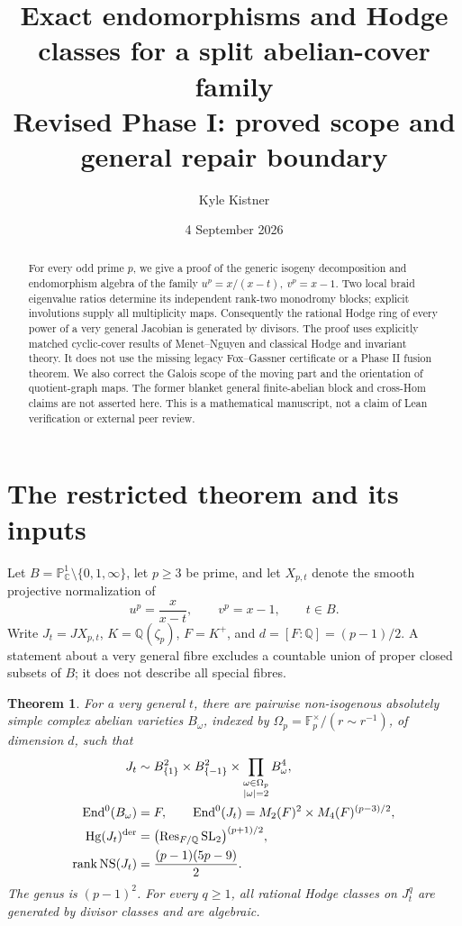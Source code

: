 \documentclass[11pt]{article}
\title{Exact endomorphisms and Hodge classes for a split abelian-cover family\\
\large Revised Phase I: proved scope and general repair boundary}
\author{Kyle Kistner}
\date{4 September 2026}
\newtheorem{theorem}{Theorem}[section]
\theoremstyle{remark}
\newcommand{\Q}{\mathbb Q}
\newcommand{\F}{\mathbb F}
\newcommand{\C}{\mathbb C}
\newcommand{\PP}{\mathbb P}
\newcommand{\End}{\operatorname{End}}
\newcommand{\Hg}{\operatorname{Hg}}
\newcommand{\SL}{\operatorname{SL}}
\newcommand{\Res}{\operatorname{Res}}
\newcommand{\NS}{\operatorname{NS}}
\begin{document}
\maketitle

\begin{abstract}
For every odd prime \(p\), we give a proof of the generic isogeny
decomposition and endomorphism algebra of the family
\(u^p=x/(x-t),\ v^p=x-1\).
Two local braid eigenvalue ratios determine its independent rank-two
monodromy blocks; explicit involutions supply all multiplicity maps.
Consequently the rational Hodge ring of every power of a very general
Jacobian is generated by divisors.  The proof uses explicitly matched
cyclic-cover results of Menet--Nguyen and classical Hodge and invariant
theory.  It does not use the missing legacy Fox--Gassner certificate or a
Phase II fusion theorem.  We also correct the Galois scope of the moving
part and the orientation of quotient-graph maps.  The former blanket
general finite-abelian block and cross-Hom claims are not asserted here.
This is a mathematical manuscript, not a claim of Lean verification or
external peer review.
\end{abstract}

\section{The restricted theorem and its inputs}
Let \(B=\PP^1_\C\setminus\{0,1,\infty\}\), let \(p\geq3\) be prime, and
let \(X_{p,t}\) denote the smooth projective normalization of
\begin{equation}\label{eq:model}
 u^p=\frac{x}{x-t},\qquad v^p=x-1,\qquad t\in B.
\end{equation}
Write \(J_t=JX_{p,t}\), \(K=\Q(\zeta_p)\), \(F=K^+\), and
\(d=[F:\Q]=(p-1)/2\).  A statement about a very general fibre excludes a
countable union of proper closed subsets of \(B\); it does not describe all
special fibres.

\begin{theorem}\label{thm:main}
For a very general \(t\), there are pairwise non-isogenous absolutely
simple complex abelian varieties \(B_\omega\), indexed by
\(\Omega_p=\F_p^\times/(r\sim r^{-1})\), of dimension \(d\), such that
\begin{align}
 J_t&\sim B_{\{1\}}^2\times B_{\{-1\}}^2
       \times\prod_{\substack{\omega\in\Omega_p\\|\omega|=2}}B_\omega^4,
       \label{eq:decomposition}\\
 \End^0(B_\omega)&=F,\qquad
 \End^0(J_t)=M_2(F)^2\times M_4(F)^{(p-3)/2},\label{eq:end}\\
 \Hg(J_t)^{\rm der}&=
       \bigl(\Res_{F/\Q}\SL_2\bigr)^{(p+1)/2},\label{eq:hg}\\
 \operatorname{rank}\NS(J_t)&=\frac{(p-1)(5p-9)}2.\label{eq:ns}
\end{align}
The genus is \((p-1)^2\).  For every \(q\geq1\), all rational Hodge
classes on \(J_t^q\) are generated by divisor classes and are algebraic.
\end{theorem}
\end{document}
